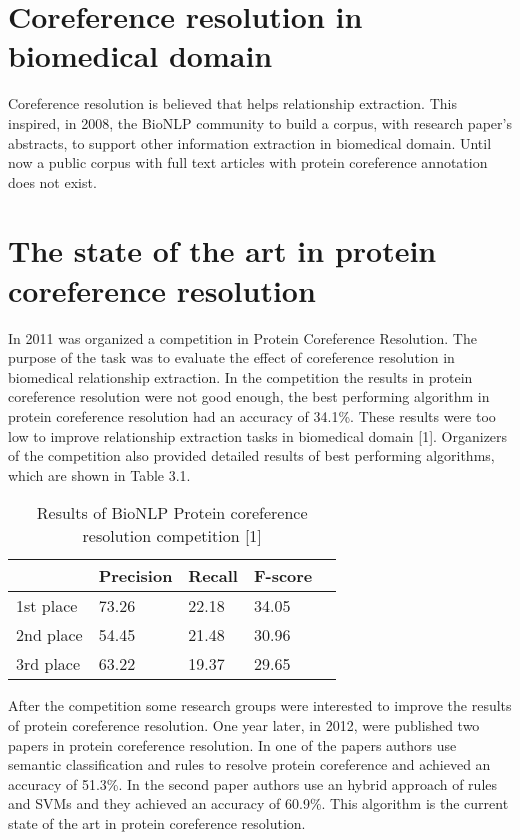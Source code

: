 \section{Coreference resolution in biomedical domain}

Coreference resolution is believed that helps relationship extraction. This inspired, in 2008, the BioNLP community to build a corpus, with research paper's abstracts, to support other information extraction in biomedical domain. Until now a public corpus with full text articles with protein coreference annotation does not exist.

\section{The state of the art in protein coreference resolution} 

In 2011 was organized a competition in Protein Coreference Resolution. The purpose of the task was to evaluate the effect of coreference resolution in biomedical relationship extraction. In the competition the results in protein coreference resolution were not good enough, the best performing algorithm in protein coreference resolution had an accuracy of 34.1\%. These results were too low to improve relationship extraction tasks in biomedical domain [1]. Organizers of the competition also provided detailed results of best performing algorithms, which are shown in Table 3.1.
\newpage
\begin{table}[h]
  \begin{center}
  \centering
     \begin{tabular}{L{2.0cm} C{2.2cm} C{2.2cm} C{2.2cm} @{}m{0pt}@{}} 
	 	
  		& Precision & Recall & F-score& \\ [1.1ex] 
 		\hline
 		1st place & 73.26 & 22.18 & 34.05& \\ [1.1ex]
 		\hline
 		2nd place & 54.45 & 21.48 & 30.96& \\[1.1ex]
  		\hline
 		3rd place & 63.22 & 19.37 & 29.65& \\ [1.1ex]
  		\hline
	\end{tabular}
  \end{center} 
  \caption{ Results of BioNLP Protein coreference resolution competition [1]}
  \label{table2}
\end{table}

After the competition some research groups were interested to improve the results of protein coreference resolution. One year later, in 2012, were published two papers in protein coreference resolution. In one of the papers authors use semantic classification and rules to resolve protein coreference and achieved an accuracy of 51.3\%. In the second paper authors use an hybrid approach of rules and SVMs and they achieved an accuracy of 60.9\%. This algorithm is the current state of the art in protein coreference resolution.
 
